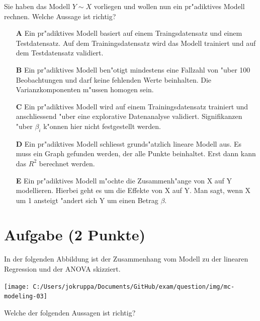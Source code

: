 \documentclass[a4paper, 10pt]{scrartcl}\usepackage[]{graphicx}\usepackage[]{color}
\begin{document}
Sie haben das Modell $Y \sim X$ vorliegen und wollen nun ein
pr{"a}diktives Modell rechnen. Welche Aussage ist richtig?



\begin{enumerate}
\item [\textbf{A} \msquare] Ein pr{"a}diktives Modell basiert auf einem Traingsdatensatz und einem Testdatensatz. Auf dem Trainingsdatensatz wird das Modell trainiert und auf dem Testdatensatz validiert.
\item [\textbf{B} \msquare] Ein pr{"a}diktives Modell ben{"o}tigt mindestens eine Fallzahl von {"u}ber 100 Beobachtungen und darf keine fehlenden Werte beinhalten. Die Varianzkomponenten m{"u}ssen homogen sein.
\item [\textbf{C} \msquare] Ein pr{"a}diktives Modell wird auf einem Trainingsdatensatz trainiert und anschliessend {"u}ber eine explorative Datenanalyse validiert. Signifikanzen {"u}ber $\beta_i$ k{"o}nnen hier nicht festgestellt werden.
\item [\textbf{D} \msquare] Ein pr{"a}diktives Modell schliesst grunds{"a}tzlich lineare Modell aus. Es muss ein Graph gefunden werden, der alle Punkte beinhaltet. Erst dann kann das $R^2$ berechnet werden.
\item [\textbf{E} \msquare] Ein pr{"a}diktives Modell m{"o}chte die Zusammenh{"a}nge von X auf Y modellieren. Hierbei geht es um die Effekte von X auf Y. Man sagt, wenn X um 1 ansteigt {"a}ndert sich Y um einen Betrag $\beta$.
\end{enumerate}

\section{Aufgabe \hfill (2 Punkte)}



In der folgenden Abbildung ist der Zusammenhang vom Modell zu der linearen
Regression und der ANOVA skizziert.

\begin{center}
  \texttt{[image: C:/Users/jokruppa/Documents/GitHub/exam/question/img/mc-modeling-03]}
\end{center}

Welche der folgenden Aussagen ist richtig?
\end{document}

